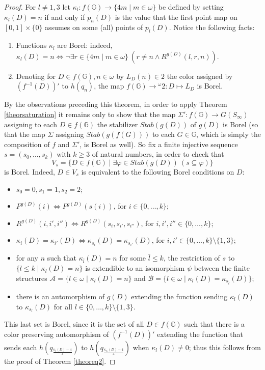 \documentclass{amsart}
\theoremstyle{definition}
\theoremstyle{remark}
\begin{document}
\begin{proof}
For $l\neq 1,3$ let $\kappa_l \colon f( {\mathbb{G}} )\to\{ 4m\mid m\in\omega\} $ be defined by setting $\kappa_l(D)=n$ if and only if $p_n(D)$ is the value that the first point map on $[0,1]\times\{ 0\} $ assumes on some (all) points of $p_l(D)$.
Notice the following facts:
\begin{enumerate}
\item Functions $\kappa_l$ are Borel:
  indeed, $\kappa_l(D)=n\Leftrightarrow\neg\exists r\in\{ 4m\mid
  m\in\omega\}\ (r\neq n\wedge R^{g(D)}(l,r,n))$.
\item Denoting for $D\in f( {\mathbb{G}} ),n\in\omega $ by $L_D(n)\in 2$
  the color assigned by $(f^{-1}(D))'$ to $h(q_n)$, the map $f( {\mathbb{G}}
  )\to {}^{ \omega }2 \colon D\mapsto L_D$ is Borel.
\end{enumerate}

By the observations preceding this theorem, in order to apply Theorem
\ref{theorsaturation} it remains only to show that the map $\Sigma' \colon f( {\mathbb{G}} )\to G(S_{\infty
})$ assigning to each $D\in f( {\mathbb{G}} )$ the
stabilizer $Stab(g(D))$ of $g(D)$ is Borel (so that the map $\Sigma$
assigning $Stab(g(f(G)))$ to each $G \in {\mathbb{G}}$, which is simply the
composition of $f$ and $\Sigma'$, is Borel as well).
So fix a finite injective sequence $s=(s_0,\ldots ,s_k)$ with $k\geq
3$ of natural numbers, in order to check that
 \[ V_s=\{ D\in f( {\mathbb{G}} )\mid\exists {\varphi} \in Stab(g(D))\ (s\subseteq {\varphi}) \} \]
is Borel.
Indeed, $D\in V_s$ is equivalent to the following
Borel conditions on $D$:
\begin{itemize}
\item $s_0=0,s_1=1,s_2=2$;
\item $P^{g(D)}(i)\Leftrightarrow P^{g(D)}(s(i))$, for $i\in\{ 0,\ldots ,k\} $;
\item $R^{g(D)}(i,i',i'')\Leftrightarrow R^{g(D)}(s_i,s_{i'},s_{i''})$, for $i,i',i''\in\{ 0,\ldots ,k\} $;
\item
  $\kappa_i(D)=\kappa_{i'}(D)\Leftrightarrow\kappa_{s_i}(D)=\kappa_{s_{i'}}(D)$, for $i,i' \in\{ 0,\ldots ,k\}\setminus\{ 1,3\} $;
\item for any $n$ such that $\kappa_{\bar{l}}(D) = n$ for some
  $\bar{l} \leq k$, the restriction of $s$ to $\{ l\leq
  k\mid\kappa_l(D)=n\} $ is extendible to an isomorphism $\psi $
  between the finite structures $ \mathcal A =\{
  l\in\omega\mid\kappa_l(D)=n\} $ and $ \mathcal B =\{
  l\in\omega\mid\kappa_l(D)=\kappa_{s_{ \bar l }}(D)\} $;
\item there is an automorphism of $g(D)$ extending the function
  sending $\kappa_l(D)$ to $\kappa_{s_l}(D)$ for all $l\in\{ 0,\ldots ,k\}\setminus\{ 1,3\} $.
\end{itemize}
This last set is Borel, since it is the set of all $D\in f( {\mathbb{G}} )$ such
that there is a color preserving automorphism of
$(f^{-1}(D))'$ extending the function that sends each $h(q_{
  \frac{\kappa_l(D)-4}4 })$ to
$h(q_{ \frac{\kappa_{s_l}(D)-4}4 })$ when $\kappa_l(D)\neq 0$; thus this follows from the proof
of Theorem \ref{theoreq2}.
\end{proof}
\end{document}

